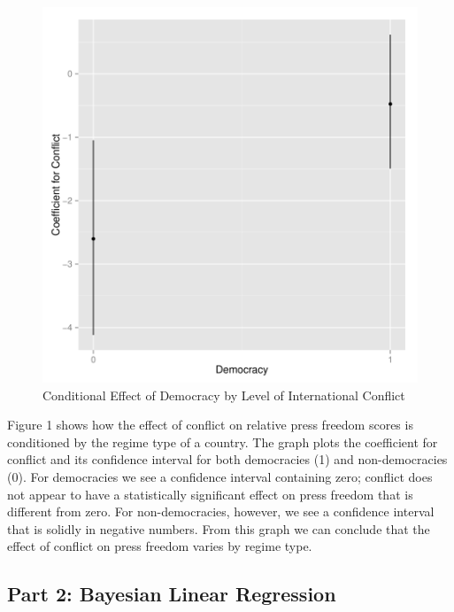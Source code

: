 \documentclass[12pt]{article}
\begin{document}
\begin{enumerate}
\begin{figure}[htbp] 
  \caption{Conditional Effect of Democracy by Level of International Conflict}
  \label{F:dem}
  \begin{center}
    \includegraphics[width=5.25in]{Exam-f1.pdf}
  \end{center}
\end{figure}

Figure 1 shows how the effect of conflict on relative press freedom scores is conditioned by the regime type of a country.  The graph plots the coefficient for conflict and its confidence interval for both democracies (1) and non-democracies (0).  For democracies we see a confidence interval containing zero; conflict does not appear to have a statistically significant effect on press freedom that is different from zero.  For non-democracies, however, we see a confidence interval that is solidly in negative numbers.  From this graph we can conclude that the effect of conflict on press freedom varies by regime type.


\pagebreak
\subsection*{Part 2: Bayesian Linear Regression}


\end{enumerate}
\end{document}
